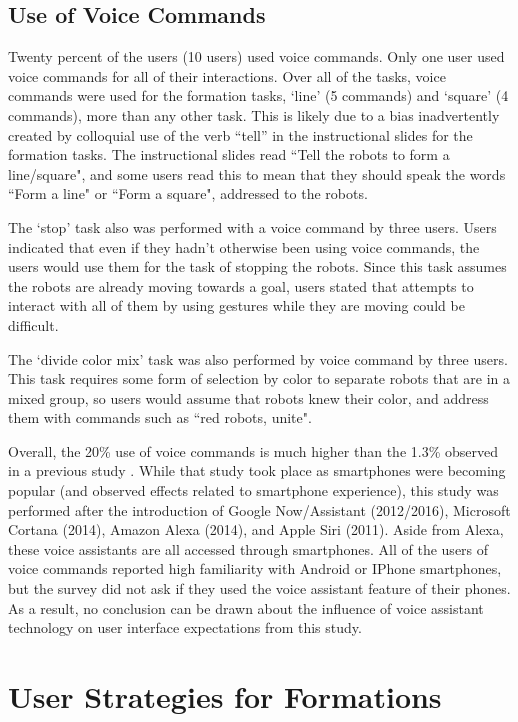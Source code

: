 \subsection{Use of Voice Commands}

Twenty percent of the users (10 users) used voice commands. 
Only one user used voice commands for all of their interactions. 
Over all of the tasks, voice commands were used for the formation tasks, `line' (5 commands) and `square' (4 commands), more than any other task. 
This is likely due to a bias inadvertently created by colloquial use of the verb ``tell'' in the instructional slides for the formation tasks.  
The instructional slides read ``Tell the robots to form a line/square", and some users read this to mean that they should speak the words ``Form a line" or ``Form a square", addressed to the robots.

The `stop' task also was performed with a voice command by three users. 
Users indicated that even if they hadn't otherwise been using voice commands, the users would use them for the task of stopping the robots. 
Since this task assumes the robots are already moving towards a goal, users stated that attempts to interact with all of them by using gestures while they are moving could be difficult. 

The `divide color mix' task was also performed by voice command by three users. 
This task requires some form of selection by color to separate robots that are in a mixed group, so users would assume that robots knew their color, and address them with commands such as ``red robots, unite".

Overall, the 20\% use of voice commands is much higher than the 1.3\% observed in a previous study \citep{micire2010multi}. 
While that study took place as smartphones were becoming popular (and observed effects related to smartphone experience), this study was performed after the introduction of Google Now/Assistant (2012/2016), Microsoft Cortana (2014), Amazon Alexa (2014), and Apple Siri (2011). 
Aside from Alexa, these voice assistants are all accessed through smartphones.  
All of the users of voice commands reported high familiarity with Android or IPhone smartphones, but the survey did not ask if they used the voice assistant feature of their phones. 
As a result, no conclusion can be drawn about the influence of voice assistant technology on user interface expectations from this study. 

\section{User Strategies for Formations}

